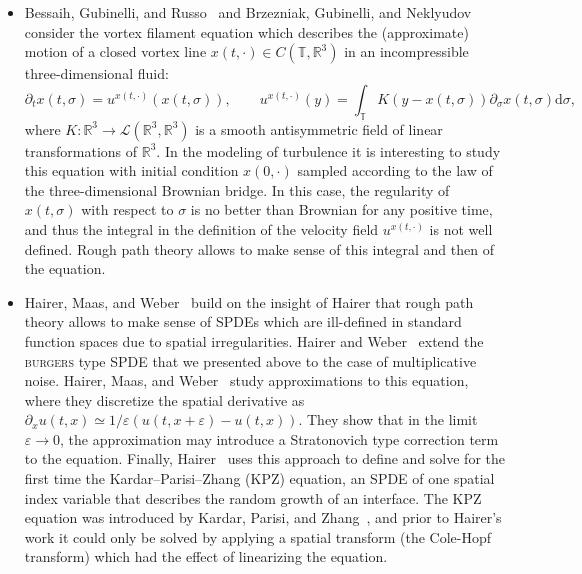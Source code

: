 \documentclass[11pt,a4paper]{article}
\newcommand{\mathd}{\mathrm{d}}
\theoremstyle{remark}
\begin{document}
\begin{itemize}
\item[--]
Bessaih, Gubinelli, and Russo~\cite{Bessaih2005} and Brzezniak, Gubinelli, and Neklyudov~\cite{Brzezniak2010} consider the vortex filament equation which describes the (approximate) motion of a closed vortex line $x(t,\cdot)\in C(\mathbb{T},\mathbb{R}^3)$ in an incompressible three-dimensional fluid:
$$
\partial_t x(t,\sigma) = u^{x(t,\cdot)}(x(t,\sigma)),\qquad u^{x(t,\cdot)}(y) = \int_{\mathbb{T}} K(y-x(t,\sigma)) \partial_\sigma x(t,\sigma) \mathd \sigma,
$$
where $K:\mathbb{R}^3 \to \mathcal{L}(\mathbb{R}^3,\mathbb{R}^3)$ is a smooth antisymmetric field of linear transformations of $\mathbb{R}^3$. In the modeling of turbulence it is interesting to study this equation with initial condition $x(0,\cdot)$ sampled according to the law of the three-dimensional Brownian bridge. In this case, the regularity of $x(t,\sigma)$ with respect to $\sigma$ is no better than Brownian for any positive time, and thus the integral in the definition of the velocity field $u^{x(t,\cdot)}$ is not well defined. Rough path theory allows to make sense of this integral and then of the equation.%

\item[--]
Hairer, Maas, and Weber~\cite{Hairer2011, Hairer2013, Hairer2013b, Hairer2012} build on the insight of Hairer that rough path theory allows to make sense of SPDEs which are ill-defined in standard function spaces due to spatial irregularities. Hairer and Weber~\cite{Hairer2013} extend the \textsc{burgers} type SPDE that we presented above to the case of multiplicative noise. Hairer, Maas, and Weber~\cite{Hairer2012} study approximations to this equation, where they discretize the spatial derivative as $\partial_x u(t,x) \simeq 1/\varepsilon (u(t,x+\varepsilon) - u(t,x))$. They show that in the limit $\varepsilon \rightarrow 0$, the approximation may introduce a Stratonovich type correction term to the equation. Finally, Hairer~\cite{Hairer2013b} uses this approach to  define and solve for the first time the Kardar--Parisi--Zhang (KPZ) equation, an SPDE of one spatial index variable that describes the random growth of an interface. The KPZ equation was introduced by Kardar, Parisi, and Zhang~\cite{Kardar1986}, and prior to Hairer's work it could only be solved by applying a spatial transform (the Cole-Hopf transform) which had the effect of linearizing the equation.
\end{itemize}
\end{document}
